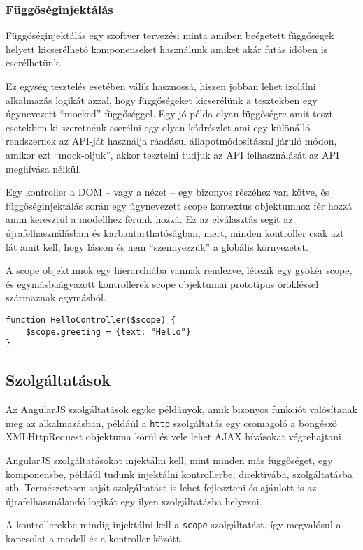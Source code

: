 \subsubsection{Függőséginjektálás}

Függőséginjektálás egy szoftver tervezési minta amiben beégetett függőségek helyett kicserélhető komponenseket használunk amiket akár futás időben is cserélhetünk. 

Ez egység tesztelés esetében válik hasznossá, hiszen jobban lehet izolálni alkalmazás logikát azzal, hogy függőségeket kicserélünk a tesztekben egy úgynevezett ``mocked'' függőséggel. Egy jó példa olyan függőségre amit teszt esetekben ki szeretnénk cserélni egy olyan kódrészlet ami egy különálló rendszernek az API-ját használja ráadásul állapotmódosítással járuló módon, amikor ezt ``mock-oljuk'', akkor tesztelni tudjuk az API felhasználását az API meghívása nélkül.

Egy kontroller a DOM -- vagy a nézet -- egy bizonyos részéhez van kötve, és függőséginjektálás során egy úgynevezett scope kontextus objektumhoz fér hozzá amin keresztül a modellhez férünk hozzá. Ez az elválasztás segít az újrafelhasználásban és karbantarthatóságban, mert, minden kontroller csak azt lát amit kell, hogy lásson és nem ``szennyezzük'' a globális környezetet. 

A scope objektumok egy hierarchiába vannak rendezve, létezik egy gyökér scope, és egymásbaágyazott kontrollerek scope objektumai prototípus örökléssel származnak egymásból.  
 
\begin{lstlisting}
function HelloController($scope) {
    $scope.greeting = {text: "Hello"}
}
\end{lstlisting}

\subsection{Szolgáltatások}

Az AngularJS szolgáltatások egyke példányok, amik bizonyos funkciót valósítanak meg az alkalmazásban, példáúl a \lstinline{http} szolgáltatás egy csomagoló a böngésző XMLHttpRequest objektuma körül és vele lehet AJAX hívásokat végrehajtani. 

AngularJS szolgáltatásokat injektálni kell, mint minden más függőséget, egy komponensbe, példáúl tudunk injektálni kontrollerbe, direktívába, szolgáltatásba stb. Természetesen saját szolgáltatást is lehet fejleszteni és ajánlott is az újrafelhasználandó logikát egy ilyen szolgáltatásba helyezni.

A kontrollerekbe mindig injektálni kell a \lstinline{scope} szolgáltatást, így megvalósul a kapcsolat a modell és a kontroller között.

